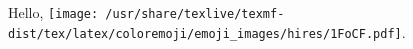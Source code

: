 \documentclass{article}
\begin{document}
Hello, \texttt{[image: /usr/share/texlive/texmf-dist/tex/latex/coloremoji/emoji\_images/hires/1FoCF.pdf]}.
\end{document}
